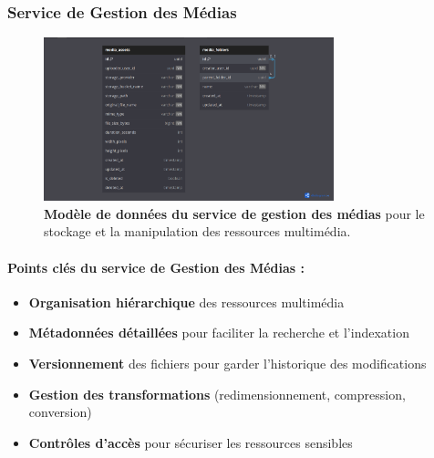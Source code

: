 \subsubsection{Service de Gestion des Médias}
\begin{figure}[H]
  \centering
  \includegraphics[width=0.75\textwidth,keepaspectratio]{week_1_img/services_db_screanshots/Screenshot 2025-06-06 at 15-08-27 Media_Management_Service.pdf.png}
  \caption{\textbf{Modèle de données du service de gestion des médias} pour le stockage et la manipulation des ressources multimédia.}
  \label{fig:media_service}
\end{figure}

\small
\paragraph{Points clés du service de Gestion des Médias :}
\begin{itemize}[leftmargin=*,noitemsep,topsep=0pt]
  \item \textbf{Organisation hiérarchique} des ressources multimédia
  \item \textbf{Métadonnées détaillées} pour faciliter la recherche et l'indexation
  \item \textbf{Versionnement} des fichiers pour garder l'historique des modifications
  \item \textbf{Gestion des transformations} (redimensionnement, compression, conversion)
  \item \textbf{Contrôles d'accès} pour sécuriser les ressources sensibles
\end{itemize}
\normalsize

